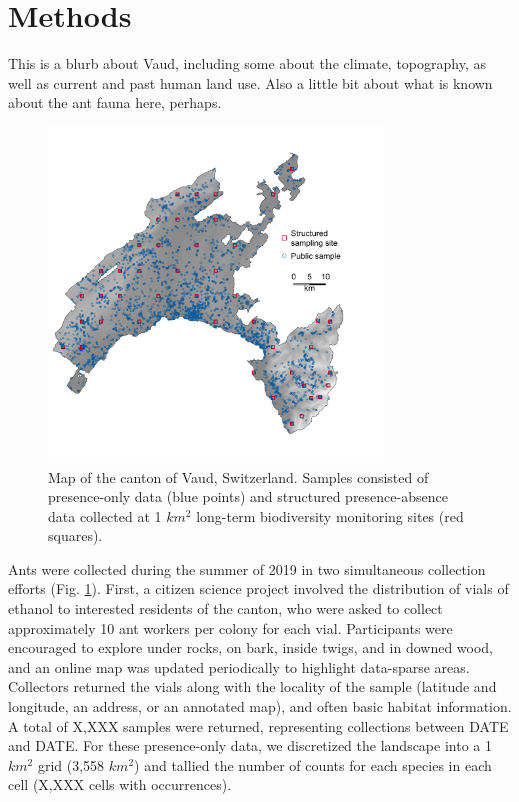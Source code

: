 \documentclass[preprint,review,times,12pt]{elsarticle}
\begin{document}
\section{Methods}
\label{S:2}
This is a blurb about Vaud, including some about the climate, topography, as well as current and past human land use. Also a little bit about what is known about the ant fauna here, perhaps.


\begin{figure}
	\centering\includegraphics[width=3.5in]{figs/map_VD.png}
	\caption{\label{fig:VD_map} Map of the canton of Vaud, Switzerland. Samples consisted of presence-only data (blue points) and structured presence-absence data collected at 1 $km^2$ long-term biodiversity monitoring sites (red squares). }
\end{figure}

Ants were collected during the summer of 2019 in two simultaneous collection efforts (Fig. \ref{fig:VD_map}). First, a citizen science project involved the distribution of vials of ethanol to interested residents of the canton, who were asked to collect approximately 10 ant workers per colony for each vial. Participants were encouraged to explore under rocks, on bark, inside twigs, and in downed wood, and an online map was updated periodically to highlight data-sparse areas. Collectors returned the vials along with the locality of the sample (latitude and longitude, an address, or an annotated map), and often basic habitat information. A total of X,XXX samples were returned, representing collections between DATE and DATE. For these presence-only data, we discretized the landscape into a 1 $km^2$ grid (3,558 $km^2$) and tallied the number of counts for each species in each cell (X,XXX cells with occurrences). 
\end{document}
